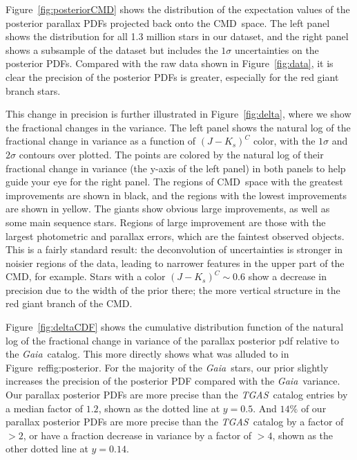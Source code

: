 \documentclass[modern]{aastex61}
\newcommand{\acronym}[1]{{\small{#1}}}
\newcommand{\project}[1]{\textsl{#1}}
\newcommand{\tgas}{\project{\acronym{TGAS}}}
\newcommand{\gaia}{\project{Gaia}}
\newcommand{\cmd}{\acronym{CMD}}
\begin{document}
Figure~\ref{fig:posteriorCMD} shows the distribution of the expectation values of the posterior parallax PDFs projected back onto the \cmd\ space.
The left panel shows the distribution for all 1.3 million stars in our dataset, and the right panel shows a subsample of the dataset but includes the $1\sigma$ uncertainties on the posterior PDFs.
Compared with the raw data shown in Figure~\ref{fig:data}, it is clear the precision of the posterior PDFs is greater, especially for the red giant branch stars.

This change in precision is further illustrated in Figure~\ref{fig:delta}, where we show the fractional changes in the variance. The left panel shows the natural log of the fractional change in variance as a function of $(J-K_s)^C$ color, with the $1\sigma$ and $2\sigma$ contours over plotted.
The points are colored by the natural log of their fractional change in variance (the y-axis of the left panel) in both panels to help guide your eye for the right panel. The regions of \cmd\ space with the greatest improvements are shown in black, and the regions with the lowest improvements are shown in yellow.
The giants show obvious large improvements, as well as some main sequence stars.
Regions of large improvement are those with the largest photometric and parallax errors, which are the faintest observed objects.
This is a fairly standard result: the deconvolution of uncertainties is stronger in noisier regions of the data, leading to narrower features in the upper part of the \cmd, for example.
Stars with a color $(J-K_s)^C \sim 0.6$ show a decrease in precision due to the width of the prior there; the more vertical structure in the red giant branch of the \cmd.

Figure~\ref{fig:deltaCDF} shows the cumulative distribution function of the natural log of the fractional change in variance of the parallax posterior pdf relative to the \gaia\ catalog. This more directly shows what was alluded to in Figure~ref{fig:posterior}. For the majority of the \gaia\ stars, our prior slightly increases the precision of the posterior PDF compared with the \gaia\ variance. Our parallax posterior PDFs are more precise than the \tgas\ catalog entries by a median factor of $1.2$, shown as the dotted line at $y=0.5$.
And $14\%$ of our parallax posterior PDFs are more precise than the \tgas\ catalog by a factor of $>2$, or have a fraction decrease in variance by a factor of $>4$, shown as the other dotted line at $y=0.14$.
\end{document}
